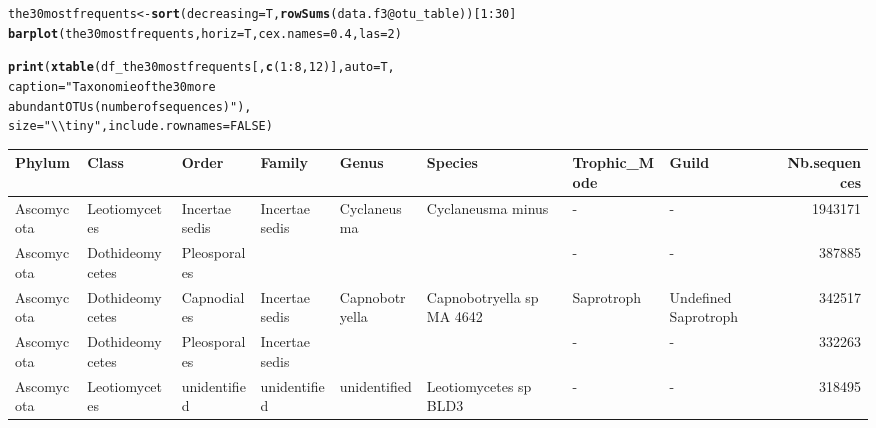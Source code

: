 \documentclass[12pt]{article}\usepackage[]{graphicx}\usepackage[]{color}
\makeatletter
\newcommand{\hlnum}[1]{\textcolor[rgb]{0.686,0.059,0.569}{#1}}%
\newcommand{\hlstr}[1]{\textcolor[rgb]{0.192,0.494,0.8}{#1}}%
\newcommand{\hlopt}[1]{\textcolor[rgb]{0,0,0}{#1}}%
\newcommand{\hlstd}[1]{\textcolor[rgb]{0.345,0.345,0.345}{#1}}%
\newcommand{\hlkwb}[1]{\textcolor[rgb]{0.69,0.353,0.396}{#1}}%
\newcommand{\hlkwc}[1]{\textcolor[rgb]{0.333,0.667,0.333}{#1}}%
\newcommand{\hlkwd}[1]{\textcolor[rgb]{0.737,0.353,0.396}{\textbf{#1}}}%
\newenvironment{kframe}{%
 \def\at@end@of@kframe{}%
 \ifinner\ifhmode%
  \def\at@end@of@kframe{\end{minipage}}%
  \begin{minipage}{\columnwidth}%
 \fi\fi%
 \def\FrameCommand##1{\hskip\@totalleftmargin \hskip-\fboxsep
 \colorbox{shadecolor}{##1}\hskip-\fboxsep
     \hskip-\linewidth \hskip-\@totalleftmargin \hskip\columnwidth}%
 \MakeFramed {\advance\hsize-\width
   \@totalleftmargin\z@ \linewidth\hsize
   \@setminipage}}%
 {\par\unskip\endMakeFramed%
 \at@end@of@kframe}
\newenvironment{knitrout}{}{} %
\numberwithin{figure}{section}
\makeatother
\begin{document}
\begin{knitrout}\small
{}\color{fgcolor}\begin{kframe}
\begin{alltt}
\hlstd{the30mostfrequents} \hlkwb{<-} \hlkwd{sort}\hlstd{(}\hlkwc{decreasing} \hlstd{= T,} \hlkwd{rowSums}\hlstd{(data.f3}\hlopt{@}\hlkwc{otu_table}\hlstd{))[}\hlnum{1}\hlopt{:}\hlnum{30}\hlstd{]}
\hlkwd{barplot}\hlstd{(the30mostfrequents,} \hlkwc{horiz} \hlstd{= T,} \hlkwc{cex.names} \hlstd{=} \hlnum{0.4}\hlstd{,} \hlkwc{las} \hlstd{=} \hlnum{2}\hlstd{)}
\end{alltt}
\end{kframe}
\end{knitrout}



\begin{landscape}
\begin{kframe}
\begin{alltt}
\hlkwd{print}\hlstd{(}\hlkwd{xtable}\hlstd{(df_the30mostfrequents[,} \hlkwd{c}\hlstd{(}\hlnum{1}\hlopt{:}\hlnum{8}\hlstd{,} \hlnum{12}\hlstd{)],} \hlkwc{auto} \hlstd{= T,}
             \hlkwc{caption} \hlstd{=} \hlstr{"Taxonomie of the 30 more
             abundant OTUs (number of sequences)"}\hlstd{),}
      \hlkwc{size} \hlstd{=} \hlstr{"\textbackslash{}\textbackslash{}tiny"}\hlstd{,} \hlkwc{include.rownames} \hlstd{=} \hlnum{FALSE}\hlstd{)}
\end{alltt}
\end{kframe}%
\begin{table}[ht]
\centering
\begingroup\tiny
\begin{tabular}{llllllllr}
  \hline
Phylum & Class & Order & Family & Genus & Species & Trophic\_Mode & Guild & Nb.sequences \\ 
  \hline
Ascomycota & Leotiomycetes & Incertae sedis & Incertae sedis & Cyclaneusma & Cyclaneusma minus & - & - & 1943171 \\ 
  Ascomycota & Dothideomycetes & Pleosporales &  &  &  & - & - & 387885 \\ 
  Ascomycota & Dothideomycetes & Capnodiales & Incertae sedis & Capnobotryella & Capnobotryella sp MA 4642 & Saprotroph & Undefined Saprotroph & 342517 \\ 
  Ascomycota & Dothideomycetes & Pleosporales & Incertae sedis &  &  & - & - & 332263 \\ 
  Ascomycota & Leotiomycetes & unidentified & unidentified & unidentified & Leotiomycetes sp BLD3 & - & - & 318495 \\ 

\end{tabular}
\end{table}
\end{landscape}
\end{document}
